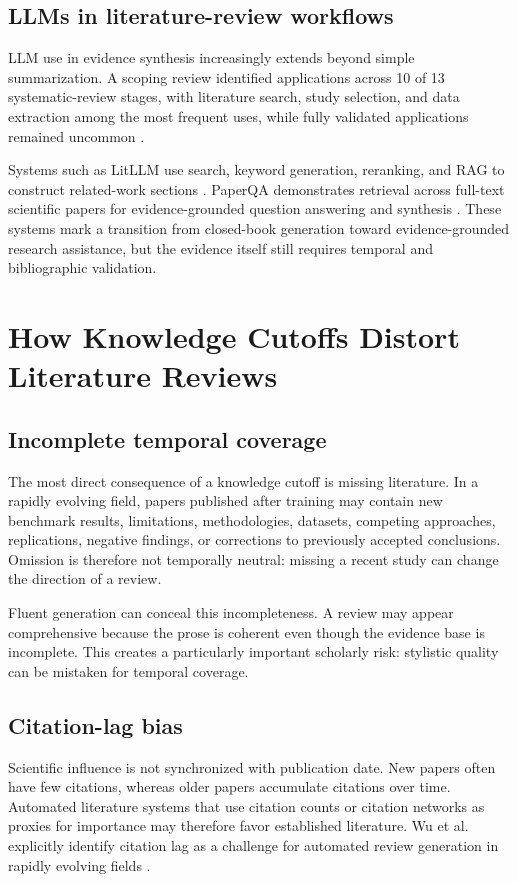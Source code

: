 \documentclass[manuscript,screen]{acmart}
\begin{document}
\subsection{LLMs in literature-review workflows}\label{subsec:workflow}
LLM use in evidence synthesis increasingly extends beyond simple summarization. A scoping review identified
applications across 10 of 13 systematic-review stages, with literature search, study selection, and data
extraction among the most frequent uses, while fully validated applications remained uncommon
\cite{lieberum2025}.

Systems such as LitLLM use search, keyword generation, reranking, and RAG to construct related-work
sections \cite{agarwal2024}. PaperQA demonstrates retrieval across full-text scientific papers for
evidence-grounded question answering and synthesis \cite{lala2023}. These systems mark a transition from
closed-book generation toward evidence-grounded research assistance, but the evidence itself still requires
temporal and bibliographic validation.

\section{How Knowledge Cutoffs Distort Literature Reviews}\label{sec:distortions}

\subsection{Incomplete temporal coverage}\label{subsec:coverage}
The most direct consequence of a knowledge cutoff is missing literature. In a rapidly evolving field, papers
published after training may contain new benchmark results, limitations, methodologies, datasets, competing
approaches, replications, negative findings, or corrections to previously accepted conclusions. Omission is
therefore not temporally neutral: missing a recent study can change the direction of a review.

Fluent generation can conceal this incompleteness. A review may appear comprehensive because the prose is
coherent even though the evidence base is incomplete. This creates a particularly important scholarly risk:
stylistic quality can be mistaken for temporal coverage.

\subsection{Citation-lag bias}\label{subsec:citationlag}
Scientific influence is not synchronized with publication date. New papers often have few citations, whereas
older papers accumulate citations over time. Automated literature systems that use citation counts or citation
networks as proxies for importance may therefore favor established literature. Wu et al. explicitly identify
citation lag as a challenge for automated review generation in rapidly evolving fields \cite{wu2025}.
\end{document}
